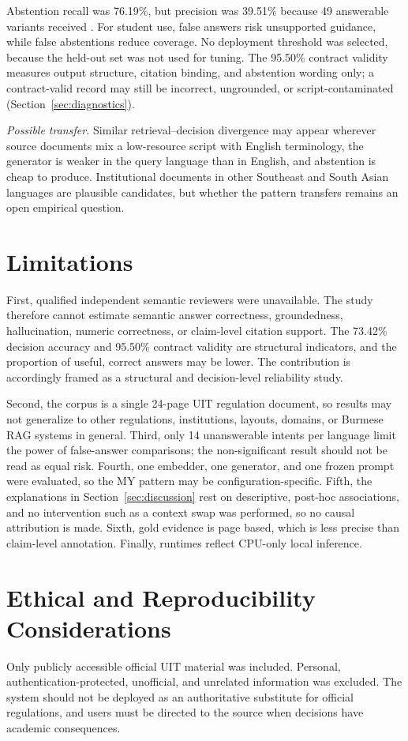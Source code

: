 \documentclass[a4paper,conference]{IEEEtran}
\newcommand{\code}[1]{\texttt{\detokenize{#1}}}
\begin{document}
Abstention recall was 76.19\%, but precision was 39.51\% because 49 answerable variants received \code{ABSTAIN}. For student use, false answers risk unsupported guidance, while false abstentions reduce coverage. No deployment threshold was selected, because the held-out set was not used for tuning. The 95.50\% contract validity measures output structure, citation binding, and abstention wording only; a contract-valid record may still be incorrect, ungrounded, or script-contaminated (Section~\ref{sec:diagnostics}).

\emph{Possible transfer.} Similar retrieval--decision divergence may appear wherever source documents mix a low-resource script with English terminology, the generator is weaker in the query language than in English, and abstention is cheap to produce. Institutional documents in other Southeast and South Asian languages are plausible candidates, but whether the pattern transfers remains an open empirical question.

\section{Limitations}
\label{sec:limitations}
First, qualified independent semantic reviewers were unavailable. The study therefore cannot estimate semantic answer correctness, groundedness, hallucination, numeric correctness, or claim-level citation support. The 73.42\% decision accuracy and 95.50\% contract validity are structural indicators, and the proportion of useful, correct answers may be lower. The contribution is accordingly framed as a structural and decision-level reliability study.

Second, the corpus is a single 24-page UIT regulation document, so results may not generalize to other regulations, institutions, layouts, domains, or Burmese RAG systems in general. Third, only 14 unanswerable intents per language limit the power of false-answer comparisons; the non-significant result should not be read as equal risk. Fourth, one embedder, one generator, and one frozen prompt were evaluated, so the MY pattern may be configuration-specific. Fifth, the explanations in Section~\ref{sec:discussion} rest on descriptive, post-hoc associations, and no intervention such as a context swap was performed, so no causal attribution is made. Sixth, gold evidence is page based, which is less precise than claim-level annotation. Finally, runtimes reflect CPU-only local inference.

\section{Ethical and Reproducibility Considerations}
Only publicly accessible official UIT material was included. Personal, authentication-protected, unofficial, and unrelated information was excluded. The system should not be deployed as an authoritative substitute for official regulations, and users must be directed to the source when decisions have academic consequences.
\end{document}
